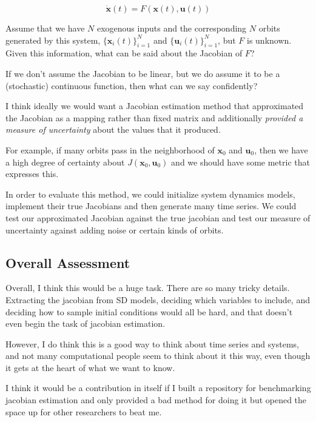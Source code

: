 \documentclass{article}
\begin{document}
        \[
            \dot{\bm{x}}(t) = F(\bm{x}(t), \bm{u}(t))
        \]

        Assume that we have $N$ exogenous inputs and the corresponding $N$ 
        orbits generated by this system, $\{\bm{x}_i(t)\}_{i=1}^N$ and
        $\{\bm{u}_i(t)\}_{i=1}^N$, but $F$ is unknown. Given this information,
        what can be said about the Jacobian of $F$?

        If we don't assume the Jacobian to be linear, but we do assume
        it to be a (stochastic) continuous function, then
        what can we say confidently?

        I think ideally we would want a Jacobian estimation method that
        approximated the Jacobian as a mapping rather than fixed matrix
        and additionally \textit{provided a measure of uncertainty} about
        the values that it produced.

        For example, if many orbits pass in the neighborhood of $\bm{x}_0$
        and $\bm{u}_0$, then we have a high degree of certainty about
        $J(\bm{x}_0, \bm{u}_0)$ and we should have some metric that expresses
        this. 

        In order to evaluate this method, we could initialize system
        dynamics models, implement their true Jacobians and
        then generate many time series. We could test our approximated
        Jacobian against the true jacobian and test our measure of
        uncertainty against adding noise or certain kinds of orbits.

        \subsection{Overall Assessment}
        Overall, I think this would be a huge task. There are so many
        tricky details.  Extracting the jacobian from SD models,
        deciding which variables to include, and deciding how to sample
        initial conditions would all be hard, and that doesn't even
        begin the task of jacobian estimation.

        However, I do think this is a good way to think about time
        series and systems, and not many computational people 
        seem to think about it this way, even though it gets at
        the heart of what we want to know.

        I think it would be a contribution in itself if I built a
        repository for benchmarking jacobian estimation and only
        provided a bad method for doing it but opened the space up for
        other researchers to beat me.

    
            
\end{document}
